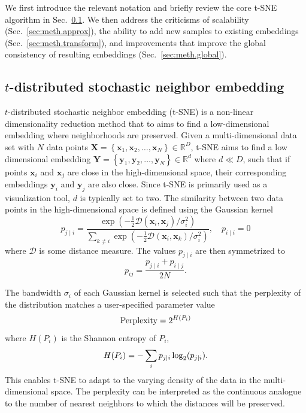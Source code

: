 \documentclass[article]{jss}
\begin{document}
We first introduce the relevant notation and briefly review the core t-SNE
algorithm in Sec.~\ref{sec:meth.tsne}. We then address the criticisms of
scalability (Sec.~\ref{sec:meth.approx}), the ability to add new samples to
existing embeddings (Sec.~\ref{sec:meth.transform}), and improvements that
improve the global consistency of resulting embeddings
(Sec.~\ref{sec:meth.global}).

\subsection{$t$-distributed stochastic neighbor embedding} \label{sec:meth.tsne}

$t$-distributed stochastic neighbor embedding (t-SNE) is a non-linear
dimensionality reduction method that to aims to find a low-dimensional embedding
where neighborhoods are preserved. Given a multi-dimensional data set with $N$ data points
$\mathbf{X} = \left \{ \mathbf{x}_1, \mathbf{x}_2, \dots, \mathbf{x}_N \right \}
\in \mathbb{R}^D$, t-SNE
aims to find a low dimensional embedding $\mathbf{Y} = \left \{ \mathbf{y}_1,
\mathbf{y}_2, \dots, \mathbf{y}_N \right\} \in \mathbb{R}^d$ where $d \ll D$,
such that if points $\mathbf{x}_i$ and $\mathbf{x}_j$ are close in the
high-dimensional space, their corresponding embeddings $\mathbf{y}_i$ and
$\mathbf{y}_j$ are also close. Since t-SNE is primarily used as a visualization
tool, $d$ is typically set to two. The similarity between two data points in the
high-dimensional space is defined using the Gaussian kernel
\begin{equation}
p_{j \mid i} = \frac{\exp \left ( -\frac{1}{2} \mathcal{D}(\mathbf{x}_i, \mathbf{x}_j ) / \sigma_i^2 \right )}
{\sum_{k \neq i } \exp \left ( -\frac{1}{2} \mathcal{D}(\mathbf{x}_i, \mathbf{x}_k ) / \sigma_i^2 \right )}, \quad p_{i \mid i} = 0
\label{eq:p_ij}
\end{equation}
where $\mathcal{D}$ is some distance measure. The values $p_{j \mid i}$
are then symmetrized to
\begin{equation}
p_{ij} = \frac{p_{j \mid i} + p_{i \mid j}}{2N}.
\label{eq:symmetrize}
\end{equation}

The bandwidth $\sigma_i$ of each Gaussian kernel is selected such that the perplexity of the distribution matches a user-specified parameter value
\begin{equation}
\text{Perplexity} = 2^{H(P_i)} \notag
\end{equation}
where $H(P_i)$ is the Shannon entropy of $P_i$,
\begin{equation}
H(P_i) = -\sum_i p_{j \mid i} \log_2 (p_{j \mid i}). \notag
\end{equation}
This enables t-SNE to adapt to the varying density of the data in the
multi-dimensional space. The perplexity can be interpreted as the continuous
analogue to the number of nearest neighbors to which the distances will be
preserved. 
\end{document}
